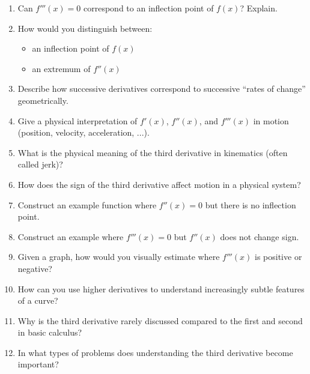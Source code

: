 \begin{enumerate}
  \item Can $f'''(x)=0$ correspond to an inflection point of $f(x)$? Explain.
  \item How would you distinguish between:
    \begin{itemize}
      \item an inflection point of $f(x)$
      \item an extremum of $f''(x)$
    \end{itemize}
  \item Describe how successive derivatives correspond to successive “rates of change” geometrically.
  \item Give a physical interpretation of $f'(x)$, $f''(x)$, and $f'''(x)$ in motion (position, velocity, acceleration, ...).
  \item What is the physical meaning of the third derivative in kinematics (often called jerk)?
  \item How does the sign of the third derivative affect motion in a physical system?
  \item Construct an example function where $f''(x)=0$ but there is no inflection point.
  \item Construct an example where $f'''(x)=0$ but $f''(x)$ does not change sign.
  \item Given a graph, how would you visually estimate where $f'''(x)$ is positive or negative?
  \item How can you use higher derivatives to understand increasingly subtle features of a curve?
  \item Why is the third derivative rarely discussed compared to the first and second in basic calculus?
  \item In what types of problems does understanding the third derivative become important?
\end{enumerate}

